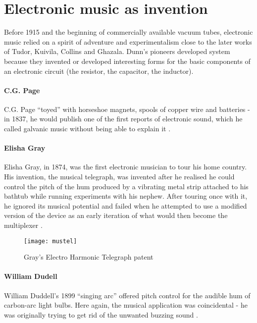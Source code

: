 \section{Electronic music as invention}

	Before 1915 and the beginning of commercially available vacuum tubes, electronic music relied on a spirit of adventure and experimentalism close to the later works of Tudor, Kuivila, Collins and Ghazala. Dunn's pioneers developed system because they invented or developed interesting forms for the basic components of an electronic circuit (the resistor, the capacitor, the inductor). 
	
\paragraph{C.G. Page}

	C.G. Page “toyed” with horseshoe magnets, spools of copper wire and batteries - in 1837, he would publish one of the first reports of electronic sound, which he called galvanic music without being able to explain it \citep{page1837}. 
	
\paragraph{Elisha Gray}

	Elisha Gray, in 1874, was the first electronic musician to tour his home country. His invention, the musical telegraph, was invented after he realised he could control the pitch of the hum produced by a vibrating metal strip attached to his bathtub while running experiments with his nephew. After touring once with it, he ignored its musical potential and failed when he attempted to use a modified version of the device as an early iteration of what would then become the multiplexer \citep{holmes2002}. 
	
	\begin{figure}[h!]
	  \caption{Gray's Electro Harmonic Telegraph patent}
	  \centering
	    \texttt{[image: mustel]}
	\end{figure}
	
\paragraph{William Dudell}

	William Duddell’s 1899 ``singing arc'' offered pitch control for the audible hum of carbon-arc light bulbs. Here again, the musical application was coincidental - he was originally trying to get rid of the unwanted buzzing sound \citep{nasmyth1908,holmes2002}. 
	
